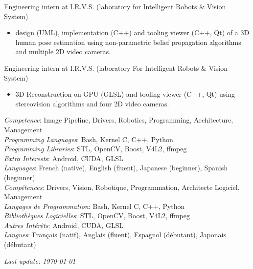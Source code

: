 \documentclass{article}
\begin{document}
\begin{llist}
 {
Engineering intern at I.R.V.S. (laboratory for Intelligent Robots \& Vision System)
\vspace{-0.33cm}
\begin{itemize}
\item design (UML), implementation (C++) and tooling viewer (C++, Qt) of a
3D human pose estimation using non-parametric belief propagation
algorithms and multiple 2D video cameras.
\end{itemize}
} {}

 {
Engineering intern at I.R.V.S. (laboratory For Intelligent Robots \& Vision System)
\vspace{-0.33cm}
\begin{itemize}
\item 3D Reconstruction on GPU (GLSL) and tooling viewer (C++, Qt) using stereovision algorithms and four 2D video cameras.
\end{itemize}
} {}

 {
{\em Competence}: Image Pipeline, Drivers, Robotics, Programming, Architecture, Management \\
{\em Programming Languages}: Bash, Kernel C, C++, Python \\
{\em Programming Libraries}: STL, OpenCV, Boost, V4L2, ffmpeg \\
{\em Extra Interests}: Android, CUDA, GLSL \\
{\em Languages}: French (native), English (fluent), Japanese (beginner), Spanish
(beginner) \\
} {
{\em Comp\'{e}tences}: Drivers, Vision, Robotique, Programmation, Architecte Logiciel,
Management \\
{\em Langages de Programmation}: Bash, Kernel C, C++, Python \\
{\em Biblioth\`{e}ques Logicielles}: STL, OpenCV, Boost, V4L2, ffmpeg \\
{\em Autres Int\'{e}r\^{e}ts}: Android, CUDA, GLSL \\
{\em Langues}: Fran\c{c}ais (natif), Anglais (fluent), Espagnol (d\'{e}butant),
Japonais (d\'{e}butant) \\
}


\end{llist}

{\em Last update: \today}
\end{document}
